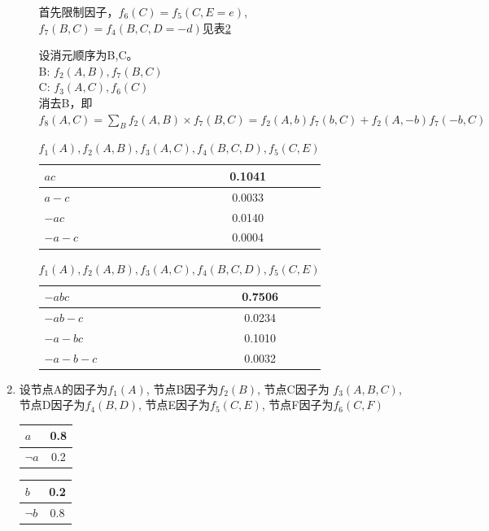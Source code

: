 \documentclass[a4paper, 11pt]{article}
\begin{document}
\begin{enumerate}
\begin{enumerate}[(a)]
    首先限制因子，$f_{6}(C)=f_{5}(C,E=e)$,$f_{7}(B,C)=f_{4}(B,C,D=-d)$见表\ref{Q3T3}

    设消元顺序为B,C。\\
    B: $f_{2}(A,B),f_{7}(B,C)$\\
    C: $f_{3}(A,C),f_{6}(C)$\\
    消去B，即$f_{8}(A,C)=\sum_B f_{2}(A,B) \times f_{7}(B,C) = f_{2}(A,b)f_{7}(b,C)+f_{2}(A,-b)f_{7}(-b,C)$
    \begin{table}[ht]
      \centering
      \begin{tabular}{|l|c|}
        \hline
        $ac$&0.1041\\
        \hline
        $a-c$&0.0033\\
        \hline
        $-ac$&0.0140\\
        \hline
        $-a-c$&0.0004\\
        \hline
      \end{tabular}
      \begin{tabular}{|l|c|}
        \hline
        $-abc$&0.7506\\
        \hline
        $-ab-c$&0.0234\\
        \hline
        $-a-bc$&0.1010\\
        \hline
        $-a-b-c$&0.0032\\
        \hline
      \end{tabular}
      \caption{$f_{1}(A), f_{2}(A,B),f_{3}(A,C),f_{4}(B,C,D),f_{5}(C,E)$}
      \label{Q3T3}
    \end{table}
    \end{enumerate}
  \item
  设节点A的因子为$f_{1}(A)$, 节点B因子为$f_{2}(B)$, 节点C因子为
  $f_{3}(A,B,C)$, 节点D因子为$f_{4}(B,D)$, 节点E因子为$f_{5}(C,E)$,
  节点F因子为$f_{6}(C,F)$\\
  \begin{table}[ht]
    \centering
    \begin{tabular}{|l|c|}
      \hline
      $a$&0.8\\
      \hline
      $\lnot a$&0.2\\
      \hline
    \end{tabular}
    \begin{tabular}{|l|c|}
      \hline
      $b$&0.2\\
      \hline
      $\lnot b$&0.8\\
      \hline
    \end{tabular}
    \begin{tabular}{|l|c|}

\end{tabular}
\end{table}
\end{enumerate}
\end{document}
